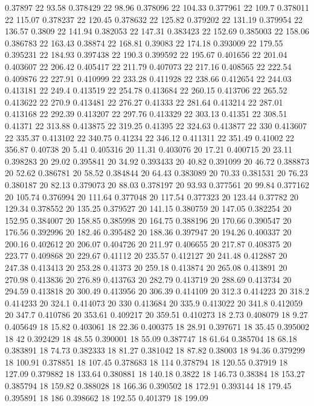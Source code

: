 0.37897 22 93.58
0.378429 22 98.96
0.378096 22 104.33
0.377961 22 109.7
0.378011 22 115.07
0.378237 22 120.45
0.378632 22 125.82
0.379202 22 131.19
0.379954 22 136.57
0.3809 22 141.94
0.382053 22 147.31
0.383423 22 152.69
0.385003 22 158.06
0.386783 22 163.43
0.38874 22 168.81
0.39083 22 174.18
0.393009 22 179.55
0.395231 22 184.93
0.397438 22 190.3
0.399592 22 195.67
0.401656 22 201.04
0.403607 22 206.42
0.405417 22 211.79
0.407073 22 217.16
0.408565 22 222.54
0.409876 22 227.91
0.410999 22 233.28
0.411928 22 238.66
0.412654 22 244.03
0.413181 22 249.4
0.413519 22 254.78
0.413684 22 260.15
0.413706 22 265.52
0.413622 22 270.9
0.413481 22 276.27
0.41333 22 281.64
0.413214 22 287.01
0.413168 22 292.39
0.413207 22 297.76
0.413329 22 303.13
0.41351 22 308.51
0.41371 22 313.88
0.413875 22 319.25
0.41395 22 324.63
0.413877 22 330
0.413607 22 335.37
0.413102 22 340.75
0.41234 22 346.12
0.411311 22 351.49
0.41002 22 356.87
0.40738 20 5.41
0.405316 20 11.31
0.403076 20 17.21
0.400715 20 23.11
0.398283 20 29.02
0.395841 20 34.92
0.393433 20 40.82
0.391099 20 46.72
0.388873 20 52.62
0.386781 20 58.52
0.384844 20 64.43
0.383089 20 70.33
0.381531 20 76.23
0.380187 20 82.13
0.379073 20 88.03
0.378197 20 93.93
0.377561 20 99.84
0.377162 20 105.74
0.376994 20 111.64
0.377048 20 117.54
0.377323 20 123.44
0.37782 20 129.34
0.378552 20 135.25
0.379527 20 141.15
0.380759 20 147.05
0.382254 20 152.95
0.384007 20 158.85
0.385998 20 164.75
0.388196 20 170.66
0.390547 20 176.56
0.392996 20 182.46
0.395482 20 188.36
0.397947 20 194.26
0.400337 20 200.16
0.402612 20 206.07
0.404726 20 211.97
0.406655 20 217.87
0.408375 20 223.77
0.409868 20 229.67
0.41112 20 235.57
0.412127 20 241.48
0.412887 20 247.38
0.413413 20 253.28
0.41373 20 259.18
0.413874 20 265.08
0.413891 20 270.98
0.413836 20 276.89
0.413763 20 282.79
0.413719 20 288.69
0.413734 20 294.59
0.413818 20 300.49
0.413956 20 306.39
0.414109 20 312.3
0.414223 20 318.2
0.414233 20 324.1
0.414073 20 330
0.413684 20 335.9
0.413022 20 341.8
0.412059 20 347.7
0.410786 20 353.61
0.409217 20 359.51
0.410273 18 2.73
0.408079 18 9.27
0.405649 18 15.82
0.403061 18 22.36
0.400375 18 28.91
0.397671 18 35.45
0.395002 18 42
0.392429 18 48.55
0.390001 18 55.09
0.387747 18 61.64
0.385704 18 68.18
0.383891 18 74.73
0.382333 18 81.27
0.381042 18 87.82
0.38003 18 94.36
0.379299 18 100.91
0.378851 18 107.45
0.378683 18 114
0.378794 18 120.55
0.37919 18 127.09
0.379882 18 133.64
0.380881 18 140.18
0.3822 18 146.73
0.38384 18 153.27
0.385794 18 159.82
0.388028 18 166.36
0.390502 18 172.91
0.393144 18 179.45
0.395891 18 186
0.398662 18 192.55
0.401379 18 199.09
